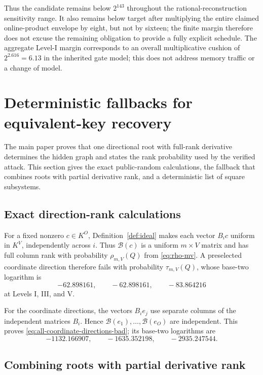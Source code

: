 \documentclass[11pt,a4paper]{article}
\theoremstyle{definition}
\theoremstyle{remark}
\begin{document}
Thus the candidate remains below $2^{143}$ throughout the rational-reconstruction sensitivity range.  It also remains below target after multiplying the entire claimed online-product envelope by eight, but not by sixteen; the finite margin therefore does not excuse the remaining obligation to provide a fully explicit schedule.  The aggregate Level-I margin corresponds to an overall multiplicative cushion of $2^{2.616}=6.13$ in the inherited gate model; this does not address memory traffic or a change of model.

\section{Deterministic fallbacks for equivalent-key recovery}\label{app:directional-fallbacks}

The main paper proves that one directional root with full-rank derivative
determines the hidden graph and states the rank probability used by the
verified attack.  This section gives the exact public-random calculations, the
fallback that combines roots with partial derivative rank, and a deterministic
list of square subsystems.

\subsection{Exact direction-rank calculations}

For a fixed nonzero $c\in K^O$, Definition~\ref{def:ideal} makes each vector
$B_ic$ uniform in $K^V$, independently across $i$.  Thus $\mathcal B(c)$ is a
uniform $m\times V$ matrix and has full column rank with probability
$\rho_{m,V}(Q)$ from \eqref{eq:rho-mv}.  A preselected coordinate direction
therefore fails with probability $\tau_{m,V}(Q)$, whose base-two logarithm is
\[
 -62.898161,\qquad -62.898161,\qquad -83.864216
\]
at Levels I, III, and V.

For the coordinate directions, the vectors $B_ie_j$ use separate columns of
the independent matrices $B_i$.  Hence
$\mathcal B(e_1),\ldots,\mathcal B(e_O)$ are independent.  This proves
\eqref{eq:all-coordinate-directions-bad}; its base-two logarithms are
\[
 -1132.166907,\qquad-1635.352198,\qquad-2935.247544.
\]

\subsection{Combining roots with partial derivative rank}
\end{document}
